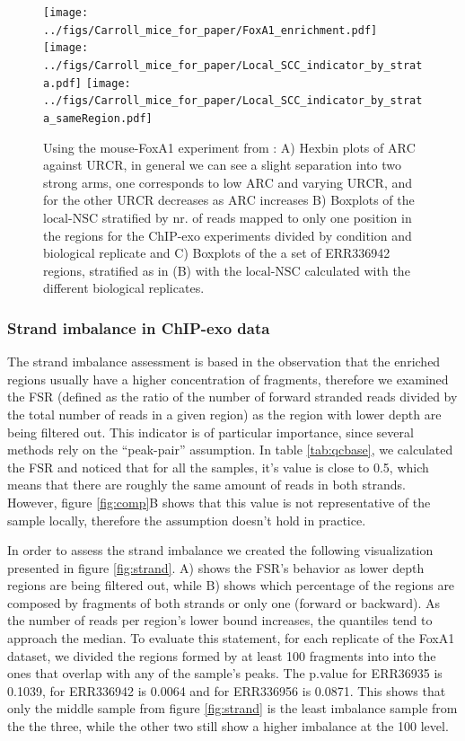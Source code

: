 \documentclass[11pt]{article}\usepackage[]{graphicx}\usepackage[]{color}
\begin{document}
\begin{figure}[H]
  \centering
  \texttt{[image: ../figs/Carroll\_mice\_for\_paper/FoxA1\_enrichment.pdf]}
  \texttt{[image: ../figs/Carroll\_mice\_for\_paper/Local\_SCC\_indicator\_by\_strata.pdf]}
  \texttt{[image: ../figs/Carroll\_mice\_for\_paper/Local\_SCC\_indicator\_by\_strata\_sameRegion.pdf]}
  \caption{Using the mouse-FoxA1 experiment from \cite{exoillumina}:
    A) Hexbin plots of $\mbox{ARC}$ against $\mbox{URCR}$, in general
    we can see a slight separation into two strong arms, one
    corresponds to low $\mbox{ARC}$ and varying $\mbox{URCR}$, and for
    the other $\mbox{URCR}$ decreases as $\mbox{ARC}$ increases B)
    Boxplots of the $\mbox{local-NSC}$ stratified by nr. of reads
    mapped to only one position in the regions for the ChIP-exo
    experiments divided by condition and biological replicate and C)
    Boxplots of the a set of ERR336942 regions, stratified as in (B)
    with the $\mbox{local-NSC}$ calculated with the different
    biological replicates.}
  \label{fig:enrich}
\end{figure}


\subsubsection{Strand imbalance in ChIP-exo data}
\label{sec:strand_imbalance}

The strand imbalance assessment is based in the observation that the
enriched regions usually have a higher concentration of fragments,
therefore we examined the FSR (defined as the ratio of the number of
forward stranded reads divided by the total number of reads in a given
region) as the region with lower depth are being filtered out. This
indicator is of particular importance, since several methods rely on
the ``peak-pair'' assumption. In table \ref{tab:qcbase}, we calculated
the FSR and noticed that for all the samples, it's value is close to
0.5, which means that there are roughly the same amount of reads in
both strands. However, figure \ref{fig:comp}B shows that this value is
not representative of the sample locally, therefore the assumption
doesn't hold in practice.



In order to assess the strand imbalance we created the following
visualization presented in figure \ref{fig:strand}. A) shows the FSR's
behavior as lower depth regions are being filtered out, while B) shows
which percentage of the regions are composed by fragments of both
strands or only one (forward or backward). As the number of reads per
region's lower bound increases, the quantiles tend to approach the
median. To evaluate this statement, for each replicate of the FoxA1
dataset, we divided the regions formed by at least 100
fragments into into the ones that overlap with any of the sample's
peaks. The p.value for ERR36935 is 0.1039, for ERR336942 is
0.0064 and for ERR336956 is 0.0871. This shows
that only the middle sample from figure \ref{fig:strand} is the least
imbalance sample from the the three, while the other two still show a
higher imbalance at the 100 level.
\end{document}
